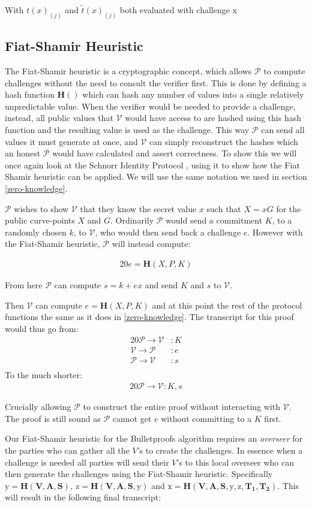 \documentclass{article}
\newcommand{\eq}[1]{\begin{alignat*}{20}#1\end{alignat*}}
\renewcommand{\vec}[1]{\boldsymbol{#1}}
\newcommand{\ran}[1]{\mathrm{#1}}
\newcommand{\V}{\mathcal{V}}
\renewcommand{\P}{\mathcal{P}}
\newcommand{\blind}[1]{\widetilde{#1}}
\newcommand{\bt}{\blind{t}}
\begin{document}
With $t(x)_{(j)}$ and $\bt(x)_{(j)}$ both evaluated with challenge $\ran{x}$

\subsection{Fiat-Shamir Heuristic}\label{fiat-shamir-heuristic}

The Fiat-Shamir heuristic \cite{zkdocs-fiat-shamir} is a cryptographic concept, which allows
$\P$ to compute challenges without the need to consult the verifier
first. This is done by defining a hash function $\textbf{H}()$ which
can hash any number of values into a single relatively unpredictable
value. When the verifier would be needed to provide a challenge,
instead, all public values that $\V$ would have access to are
hashed using this hash function and the resulting value is used as
the challenge. This way $\P$ can send all values it must generate at
once, and $\V$ can simply reconstruct the hashes which an honest $\P$
would have calculated and assert correctness. To show this we will
once again look at the Schnorr Identity Protocol \cite{zkdocs-schnorr}, using it to show
how the Fiat Shamir heuristic can be applied. We will use the same
notation we used in section \ref{zero-knowledge}.

$\P$ wishes to show $\V$ that they know the secret value $x$ such that
$X = xG$ for the public curve-points $X$ and $G$. Ordinarily $\P$ would
send a commitment $K$, to a randomly chosen $k$, to $\V$, who would
then send back a challenge $e$. However with the Fiat-Shamir heuristic,
$\P$ will instead compute:

\eq{
	e = \textbf{H}(X,P,K)
}

From here $\P$ can compute $s = k + ex$ and send $K$ and $s$ to $\V$.

Then $\V$ can compute $e = \textbf{H}(X,P,K)$ and at this
point the rest of the protocol functions the same as it does in
\ref{zero-knowledge}. The transcript for this proof would thus go from:
\eq{
	\P \rightarrow \V &: K \\
	\V \rightarrow \P &: e \\
	\P \rightarrow \V &: s \\
}
To the much shorter:
\eq{
	\P \rightarrow \V: K, s
}

Crucially allowing $\P$ to construct the entire proof without
interacting with $\V$. The proof is still sound as $\P$ cannot get $e$
without committing to a $K$ first.

Our Fiat-Shamir heuristic for the Bulletproofs algorithm requires
an \textit{overseer} for the parties who can gather all the $V$'s
to create the challenges. In essence when a challenge is needed all
parties will send their $V$'s to this local overseer who can then
generate the challenges using the Fiat-Shamir heuristic. Specifically
$\ran{y} = \textbf{H}(\vec{V},\vec{A},\vec{S}), \ \ran{z} =
\textbf{H}(\vec{V},\vec{A},\vec{S}, \ran{y})$ and $\ran{x}
= \textbf{H}(\vec{V},\vec{A},\vec{S}, \ran{y}, \ran{z},
\vec{T_1},\vec{T_2})$. This will result in the following final
transcript:
\end{document}
